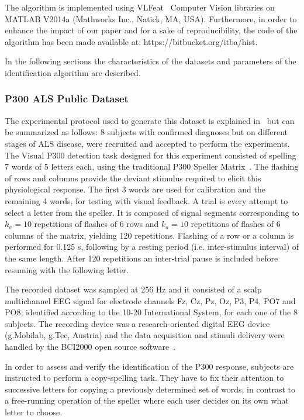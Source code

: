\documentclass[utf8]{frontiersSCNS} %
\begin{document}
The algorithm is implemented using  VLFeat~\citep{Vedaldi2010} Computer Vision libraries on MATLAB V2014a (Mathworks Inc., Natick, MA, USA). Furthermore, in order to enhance the impact of our paper and for a sake of reproducibility, the code of the algorithm has been made available at: https://bitbucket.org/itba/hist.

In the following sections the characteristics of the datasets and parameters of the identification algorithm are described. 


\subsubsection{P300 ALS Public Dataset} \label{ALSDataset}

The experimental protocol used to generate this dataset is explained in~\citep{Riccio2013} but can be summarized as follows:  8 subjects with confirmed diagnoses but on different stages of ALS disease, were recruited and accepted to perform the experiments. The Visual P300 detection task designed for this experiment consisted of spelling 7 words of 5 letters each, using the traditional P300 Speller Matrix~\citep{Farwell1988}. The flashing of rows and columns provide the deviant stimulus required to elicit this physiological response.  The first 3 words are used for calibration and the remaining 4 words, for testing with visual feedback.  A trial is every attempt to select a letter from the speller. It is composed of signal segments corresponding to $k_a =10$ repetitions of flashes of 6 rows and $k_a =10$ repetitions of flashes of 6 columns of the matrix, yielding 120 repetitions.  Flashing of a row or a column is performed for 0.125 s, following by a resting period (i.e. inter-stimulus interval) of the same length.  After 120 repetitions an inter-trial pause is included before resuming with the following letter.

The recorded dataset was sampled at 256 Hz and it consisted of a scalp multichannel EEG signal for electrode channels Fz, Cz, Pz, Oz, P3, P4, PO7 and PO8, identified according to the 10-20 International System,  for each one of the 8 subjects.   The recording device was a research-oriented digital EEG device (g.Mobilab, g.Tec, Austria) and the data acquisition and stimuli delivery were handled by the BCI2000 open source software~\citep{Schalk2004}.

In order to assess and verify the identification of the P300 response, subjects are instructed to perform a copy-spelling task. They have to fix their attention to successive letters for copying a previously determined set of words, in contrast to a free-running operation of the speller where each user decides on its own what letter to choose.
\end{document}
